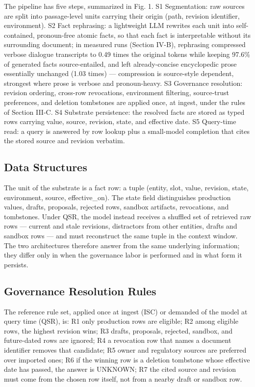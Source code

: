 \documentclass[conference,a4paper]{IEEEtran}
\begin{document}
The pipeline has five steps, summarized in Fig. 1. S1 Segmentation: raw sources are split into passage-level units carrying their origin (path, revision identifier, environment). S2 Fact rephrasing: a lightweight LLM rewrites each unit into self-contained, pronoun-free atomic facts, so that each fact is interpretable without its surrounding document; in measured runs (Section IV-B), rephrasing compressed verbose dialogue transcripts to 0.49 times the original tokens while keeping 97.6\% of generated facts source-entailed, and left already-concise encyclopedic prose essentially unchanged (1.03 times) --- compression is source-style dependent, strongest where prose is verbose and pronoun-heavy. S3 Governance resolution: revision ordering, cross-row revocations, environment filtering, source-trust preferences, and deletion tombstones are applied once, at ingest, under the rules of Section III-C. S4 Substrate persistence: the resolved facts are stored as typed rows carrying value, source, revision, state, and effective date. S5 Query-time read: a query is answered by row lookup plus a small-model completion that cites the stored source and revision verbatim.

\subsection{Data Structures}

The unit of the substrate is a fact row: a tuple (entity, slot, value, revision, state, environment, source, effective\_on). The state field distinguishes production values, drafts, proposals, rejected rows, sandbox artifacts, revocations, and tombstones. Under QSR, the model instead receives a shuffled set of retrieved raw rows --- current and stale revisions, distractors from other entities, drafts and sandbox rows --- and must reconstruct the same tuple in the context window. The two architectures therefore answer from the same underlying information; they differ only in when the governance labor is performed and in what form it persists.

\subsection{Governance Resolution Rules}

The reference rule set, applied once at ingest (ISC) or demanded of the model at query time (QSR), is: R1 only production rows are eligible; R2 among eligible rows, the highest revision wins; R3 drafts, proposals, rejected, sandbox, and future-dated rows are ignored; R4 a revocation row that names a document identifier removes that candidate; R5 owner and regulatory sources are preferred over imported ones; R6 if the winning row is a deletion tombstone whose effective date has passed, the answer is UNKNOWN; R7 the cited source and revision must come from the chosen row itself, not from a nearby draft or sandbox row.
\end{document}

